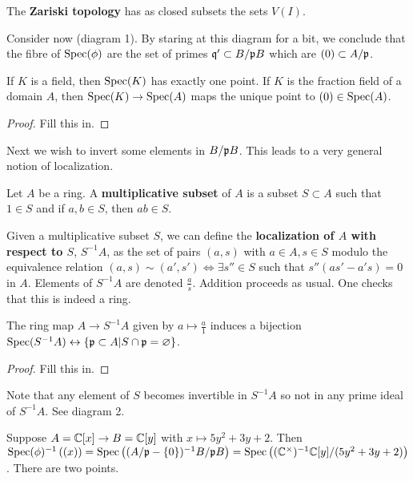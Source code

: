 \documentclass{../mathnotes}
\begin{document}
\begin{rem}
    The \textbf{Zariski topology} has as closed subsets the sets $V(I)$.
\end{rem}

Consider now (diagram 1). By staring at this diagram for a bit, we conclude that the fibre of $\operatorname{Spec}(\phi)$ are the set of primes $\mathfrak q'\subset B/\mathfrak pB$
which are $(0)\subset A/\mathfrak p$.

\begin{lem}
    If $K$ is a field, then $\operatorname{Spec}(K)$ has exactly one point. If $K$ is the fraction field of a domain $A$, then $\operatorname{Spec}(K)\to\operatorname{Spec}(A)$
    maps the unique point to $(0)\in\operatorname{Spec}(A)$.
\end{lem}
\begin{proof}
    Fill this in.
\end{proof}

Next we wish to invert some elements in $B/\mathfrak p B$. This leads to a very general notion of localization.

\begin{defn}
    Let $A$ be a ring. A \textbf{multiplicative subset} of $A$ is a subset $S\subset A$ such that $1\in S$ and if $a,b\in S$,
    then $ab\in S$.
\end{defn}

\begin{defn}
    Given a multiplicative subset $S$, we can define the \textbf{localization of $A$ with respect to $S$}, $S^{-1}A$, as the set of pairs $(a,s)$ with $a\in A,s\in S$ modulo the equivalence relation
    $(a,s)\sim(a',s')\iff \exists s''\in S$ such that $s''(as'-a's)=0$ in $A$. Elements of $S^{-1}A$ are denoted $\frac{a}{s}$. Addition proceeds
    as usual. One checks that this is indeed a ring.
\end{defn}

\begin{lem}
    The ring map $A\to S^{-1}A$ given by $a\mapsto \frac{a}{1}$ induces a bijection $\operatorname{Spec}(S^{-1}A)\leftrightarrow\left\{ \mathfrak p\subset A|S\cap \mathfrak p=\varnothing \right\}$.
\end{lem}
\begin{proof}
    Fill this in.
\end{proof}
Note that any element of $S$ becomes invertible in $S^{-1}A$ so not in any prime ideal of $S^{-1}A$.
See diagram 2.

\begin{exmp}
    Suppose $A=\mathbb{C}[x]\to B=\mathbb{C}[y]$ with $x\mapsto 5y^2+3y+2$. Then $\operatorname{Spec}(\phi)^{-1}\left( (x) \right)=\operatorname{Spec}\left( (A/\mathfrak p-\left\{ 0 \right\})^{-1} B/\mathfrak p B \right)=\operatorname{Spec}\left( (\mathbb{C}^\times)^{-1}\mathbb{C}[y]/(5y^2+3y+2) \right)$. There are two points.
\end{exmp}
\end{document}

